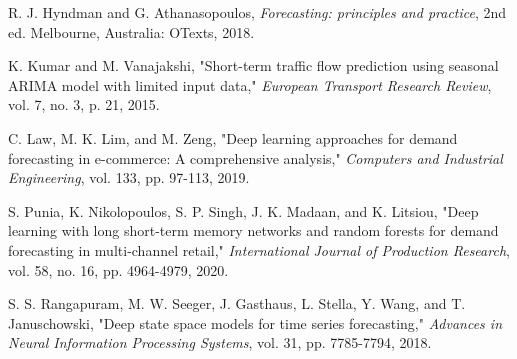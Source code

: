 \documentclass[conference]{IEEEtran}
\begin{document}
\begin{thebibliography}{00}
 R. J. Hyndman and G. Athanasopoulos, \textit{Forecasting: principles and practice}, 2nd ed. Melbourne, Australia: OTexts, 2018.

 K. Kumar and M. Vanajakshi, "Short-term traffic flow prediction using seasonal ARIMA model with limited input data," \textit{European Transport Research Review}, vol. 7, no. 3, p. 21, 2015.

 C. Law, M. K. Lim, and M. Zeng, "Deep learning approaches for demand forecasting in e-commerce: A comprehensive analysis," \textit{Computers and Industrial Engineering}, vol. 133, pp. 97-113, 2019.

 S. Punia, K. Nikolopoulos, S. P. Singh, J. K. Madaan, and K. Litsiou, "Deep learning with long short-term memory networks and random forests for demand forecasting in multi-channel retail," \textit{International Journal of Production Research}, vol. 58, no. 16, pp. 4964-4979, 2020.

 S. S. Rangapuram, M. W. Seeger, J. Gasthaus, L. Stella, Y. Wang, and T. Januschowski, "Deep state space models for time series forecasting," \textit{Advances in Neural Information Processing Systems}, vol. 31, pp. 7785-7794, 2018.

\end{thebibliography}



\balance
\end{document}
